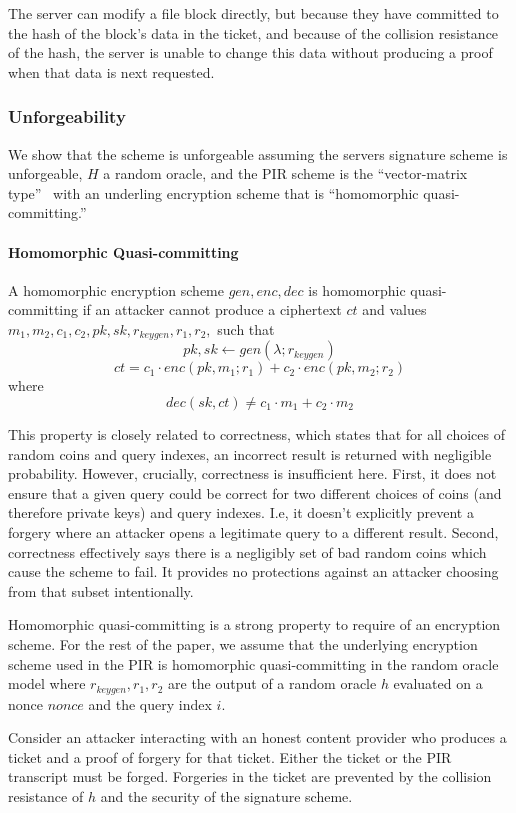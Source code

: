 The server can modify a file block directly, but because they have
committed to the hash of the block's data in the ticket, and because of the
collision resistance of the hash, the server is unable to change this data
without producing a proof when that data is next requested.

\subsubsection{Unforgeability}

We show that the scheme is unforgeable assuming the servers signature scheme is
unforgeable, $H$ a  random oracle, and the PIR scheme is the ``vector-matrix
type''~\cite{cryptoeprint:2017:825} with an underling encryption scheme that  is
``homomorphic quasi-committing.''

\paragraph{Homomorphic Quasi-committing}
A homomorphic encryption scheme $gen,enc,dec$ is homomorphic quasi-committing if
an attacker cannot produce a ciphertext $ct$ and values
$m_1,m_2,c_1,\allowbreak c_2,pk,sk,r_{keygen},r_1,r_2,$  such that $$pk,sk\leftarrow
gen(\lambda;r_{keygen})$$ $$ct=c_1\cdot enc(pk,m_1;r_1)+c_2\cdot
enc(pk,m_2;r_2)$$ where $$dec(sk,ct)\ne c_1\cdot m_1+c_2\cdot m_2 $$

This property is closely  related to  correctness, which states that for all
choices of random coins and query indexes, an incorrect result is returned with
negligible probability. However, crucially,  correctness is insufficient here.
First, it does not ensure that a given query could be correct for two different
choices of coins (and therefore private keys) and query indexes. I.e, it doesn't
explicitly prevent a forgery where an attacker opens a legitimate query to a
different result. Second, correctness effectively says there is a negligibly
set of bad random coins which cause the scheme to fail. It provides no
protections against an attacker choosing from that subset intentionally.

Homomorphic quasi-committing is a strong property to require of an encryption
scheme. For the rest of the paper, we assume that the underlying encryption
scheme used in the PIR is homomorphic quasi-committing in the random oracle
model where $r_{keygen},r_1,r_2$ are the output of a random oracle $h$ evaluated
on a nonce $nonce$ and the query index $i$.

Consider an attacker interacting with an honest content provider who produces a
ticket and a proof of forgery for that ticket. Either the ticket or the PIR
transcript must be forged.  Forgeries in the ticket are prevented by the
collision resistance of $h$ and the security of the signature scheme.

